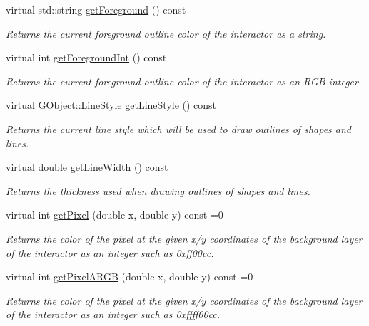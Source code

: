 \begin{DoxyCompactItemize}
virtual std\+::string \mbox{\hyperlink{classGDrawingSurface_a4fa2d8b0192a3a5b4af4bbfe71194d03}{get\+Foreground}} () const
\begin{DoxyCompactList}\small\item\em Returns the current foreground outline color of the interactor as a string. \end{DoxyCompactList}\item 
virtual int \mbox{\hyperlink{classGDrawingSurface_ac3b12ab385a6ef9ae90fc879860ba726}{get\+Foreground\+Int}} () const
\begin{DoxyCompactList}\small\item\em Returns the current foreground outline color of the interactor as an R\+GB integer. \end{DoxyCompactList}\item 
virtual \mbox{\hyperlink{classGObject_a86e0f5648542856159bb40775c854aa7}{G\+Object\+::\+Line\+Style}} \mbox{\hyperlink{classGDrawingSurface_aaf1f5ea8281e5e3486662878d26f0a13}{get\+Line\+Style}} () const
\begin{DoxyCompactList}\small\item\em Returns the current line style which will be used to draw outlines of shapes and lines. \end{DoxyCompactList}\item 
virtual double \mbox{\hyperlink{classGDrawingSurface_a85ff266dc3eb63d9f2d8e5a4487fd3c0}{get\+Line\+Width}} () const
\begin{DoxyCompactList}\small\item\em Returns the thickness used when drawing outlines of shapes and lines. \end{DoxyCompactList}\item 
virtual int \mbox{\hyperlink{classGDrawingSurface_a40f3e3f64a8263e13b7162e15b2979ee}{get\+Pixel}} (double x, double y) const =0
\begin{DoxyCompactList}\small\item\em Returns the color of the pixel at the given x/y coordinates of the background layer of the interactor as an integer such as 0xff00cc. \end{DoxyCompactList}\item 
virtual int \mbox{\hyperlink{classGDrawingSurface_aee10de1ca7da1fc3f3fc0e48286f88f8}{get\+Pixel\+A\+R\+GB}} (double x, double y) const =0
\begin{DoxyCompactList}\small\item\em Returns the color of the pixel at the given x/y coordinates of the background layer of the interactor as an integer such as 0xffff00cc. \end{DoxyCompactList}\item 

\end{DoxyCompactItemize}
